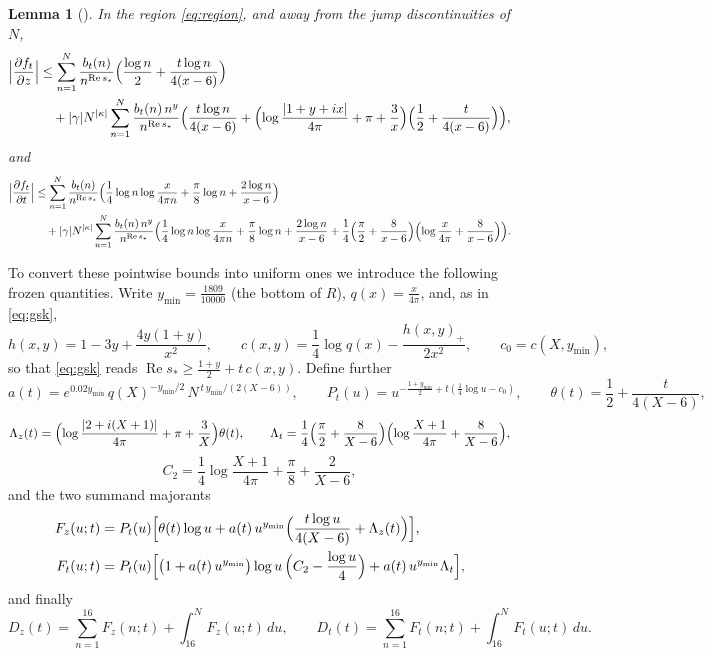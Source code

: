 \documentclass[11pt]{article}
\newtheorem{lemma}[theorem]{Lemma}
\theoremstyle{definition}
\DeclareMathOperator{\Rea}{Re}
\begin{document}
\begin{lemma}[{\cite[Lemma~8.4]{Polymath}}]\label{lem:polyderiv}
In the region \eqref{eq:region}, and away from the jump
discontinuities of $N$,
\begin{align*}
\Bigl|\frac{\partial f_t}{\partial z}\Bigr|
&\le\sum_{n=1}^{N}\frac{b_t(n)}{n^{\Rea s_*}}
\Bigl(\frac{\log n}2+\frac{t\log n}{4(x-6)}\Bigr)\\
&\quad+|\gamma|N^{|\kappa|}\sum_{n=1}^{N}
\frac{b_t(n)\,n^y}{n^{\Rea s_*}}
\Bigl(\frac{t\log n}{4(x-6)}
+\Bigl(\log\frac{|1+y+ix|}{4\pi}+\pi+\frac3x\Bigr)
\Bigl(\frac12+\frac t{4(x-6)}\Bigr)\Bigr),
\end{align*}
and
\begin{align*}
\Bigl|\frac{\partial f_t}{\partial t}\Bigr|
&\le\sum_{n=1}^{N}\frac{b_t(n)}{n^{\Rea s_*}}
\Bigl(\frac14\log n\log\frac x{4\pi n}+\frac\pi8\log n
+\frac{2\log n}{x-6}\Bigr)\\
&\quad+|\gamma|N^{|\kappa|}\sum_{n=1}^{N}
\frac{b_t(n)\,n^y}{n^{\Rea s_*}}
\Bigl(\frac14\log n\log\frac x{4\pi n}+\frac\pi8\log n
+\frac{2\log n}{x-6}
+\frac14\Bigl(\frac\pi2+\frac8{x-6}\Bigr)
\Bigl(\log\frac x{4\pi}+\frac8{x-6}\Bigr)\Bigr).
\end{align*}
\end{lemma}

To convert these pointwise bounds into uniform ones we introduce the
following frozen quantities. Write $y_{\min}=\frac{1809}{10000}$
(the bottom of $R$), $q(x)=\frac x{4\pi}$, and, as in
\eqref{eq:gsk},
\[
h(x,y)=1-3y+\frac{4y(1+y)}{x^2},
\qquad
c(x,y)=\frac14\log q(x)-\frac{h(x,y)_+}{2x^2},
\qquad
c_0=c(X,y_{\min}),
\]
so that \eqref{eq:gsk} reads
$\Rea s_*\ge\frac{1+y}2+t\,c(x,y)$. Define further
\[
a(t)=e^{0.02y_{\min}}\,q(X)^{-y_{\min}/2}\,
N^{\,t\,y_{\min}/(2(X-6))},
\qquad
P_t(u)=u^{-\frac{1+y_{\min}}2+t(\frac14\log u-c_0)},
\qquad
\theta(t)=\frac12+\frac t{4(X-6)},
\]
\[
\Lambda_z(t)=\Bigl(\log\frac{|2+i(X+1)|}{4\pi}+\pi+\frac3X\Bigr)
\theta(t),
\qquad
\Lambda_t=\frac14\Bigl(\frac\pi2+\frac8{X-6}\Bigr)
\Bigl(\log\frac{X+1}{4\pi}+\frac8{X-6}\Bigr),
\]
\[
C_2=\frac14\log\frac{X+1}{4\pi}+\frac\pi8+\frac2{X-6},
\]
and the two summand majorants
\begin{align*}
F_z(u;t)&=P_t(u)\Bigl[\theta(t)\log u
+a(t)\,u^{y_{\min}}\Bigl(\frac{t\log u}{4(X-6)}
+\Lambda_z(t)\Bigr)\Bigr],\\
F_t(u;t)&=P_t(u)\Bigl[\bigl(1+a(t)\,u^{y_{\min}}\bigr)
\log u\,\Bigl(C_2-\frac{\log u}4\Bigr)
+a(t)\,u^{y_{\min}}\Lambda_t\Bigr],
\end{align*}
and finally
\[
D_z(t)=\sum_{n=1}^{16}F_z(n;t)+\int_{16}^{N}F_z(u;t)\,du,
\qquad
D_t(t)=\sum_{n=1}^{16}F_t(n;t)+\int_{16}^{N}F_t(u;t)\,du .
\]
\end{document}
